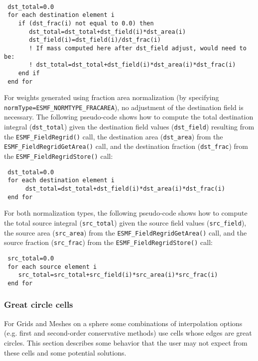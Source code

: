 \begin{verbatim}

 dst_total=0.0
 for each destination element i
    if (dst_frac(i) not equal to 0.0) then
       dst_total=dst_total+dst_field(i)*dst_area(i) 
       dst_field(i)=dst_field(i)/dst_frac(i)
       ! If mass computed here after dst_field adjust, would need to be:
       ! dst_total=dst_total+dst_field(i)*dst_area(i)*dst_frac(i) 
    end if
 end for
\end{verbatim}

For weights generated using fraction area normalization (by specifying {\tt normType=ESMF\_NORMTYPE\_FRACAREA}),
no adjustment of the destination field is necessary. The following pseudo-code shows how to compute 
the total destination integral ({\tt dst\_total}) given the
destination field values ({\tt dst\_field}) resulting
from the {\tt ESMF\_FieldRegrid()} call, the destination area ({\tt dst\_area}) from the {\tt ESMF\_FieldRegridGetArea()}
call,  and the destination fraction ({\tt dst\_frac}) from the {\tt ESMF\_FieldRegridStore()} call:

\begin{verbatim}
 dst_total=0.0
 for each destination element i
      dst_total=dst_total+dst_field(i)*dst_area(i)*dst_frac(i) 
 end for
\end{verbatim}

 For both normalization types, the following pseudo-code shows how to compute the total source integral ({\tt src\_total}) given the source field values
 ({\tt src\_field}), the source area ({\tt src\_area}) from the {\tt ESMF\_FieldRegridGetArea()} call, and
 the source fraction ({\tt src\_frac}) from the {\tt ESMF\_FieldRegridStore()} call:

\begin{verbatim}
 src_total=0.0
 for each source element i
    src_total=src_total+src_field(i)*src_area(i)*src_frac(i)
 end for
\end{verbatim}

\subsubsection{Great circle cells}\label{sec:interpolation:great_circle_cells}
 For Grids and Meshes on a sphere some combinations of interpolation options 
 (e.g. first and second-order conservative methods) use cells whose edges are great circles. This section describes some behavior 
 that the user may not expect from these cells and some potential solutions. 
 
